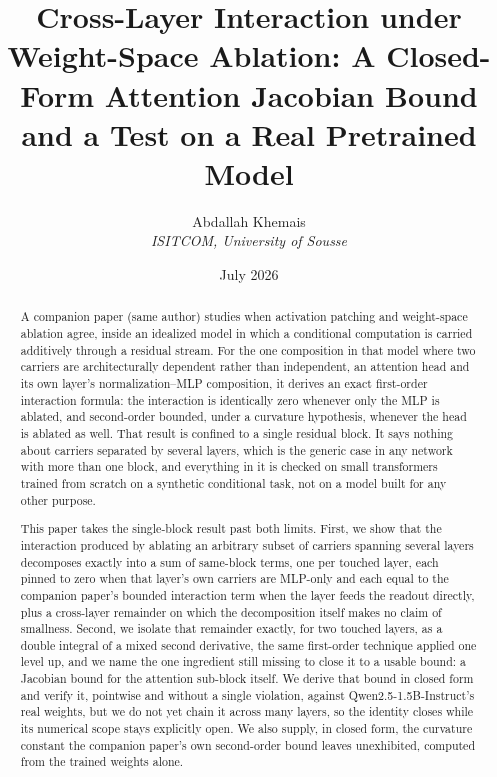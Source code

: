 \documentclass[11pt,a4paper]{article}
\begin{document}
\title{Cross-Layer Interaction under Weight-Space Ablation: A Closed-Form
Attention Jacobian Bound and a Test on a Real Pretrained Model}
\author{Abdallah Khemais \\ \textit{ISITCOM, University of Sousse}}
\date{July 2026}

\maketitle

\begin{abstract}
A companion paper (same author) studies when activation patching and
weight-space ablation agree, inside an idealized model in which a
conditional computation is carried additively through a residual stream. For
the one composition in that model where two carriers are architecturally
dependent rather than independent, an attention head and its own layer's
normalization--MLP composition, it derives an exact first-order interaction
formula: the interaction is identically zero whenever only the MLP is
ablated, and second-order bounded, under a curvature hypothesis, whenever the
head is ablated as well. That result is confined to a single residual block.
It says nothing about carriers separated by several layers, which is the
generic case in any network with more than one block, and everything in it
is checked on small transformers trained from scratch on a synthetic
conditional task, not on a model built for any other purpose.

This paper takes the single-block result past both limits. First, we show
that the interaction produced by ablating an arbitrary subset of carriers
spanning several layers decomposes exactly into a sum of same-block terms,
one per touched layer, each pinned to zero when that layer's own carriers are
MLP-only and each equal to the companion paper's bounded interaction term
when the layer feeds the readout directly, plus a cross-layer remainder on
which the decomposition itself makes no claim of smallness. Second, we
isolate that remainder exactly, for two touched layers, as a double integral
of a mixed second derivative, the same first-order technique applied one
level up, and we name the one ingredient still missing to close it to a
usable bound: a Jacobian bound for the attention sub-block itself. We derive
that bound in closed form and verify it, pointwise and without a single
violation, against Qwen2.5-1.5B-Instruct's real weights, but we do not yet
chain it across many layers, so the identity closes while its numerical
scope stays explicitly open. We also supply, in closed form, the curvature
constant the companion paper's own second-order bound leaves unexhibited,
computed from the trained weights alone.


\end{abstract}
\end{document}

